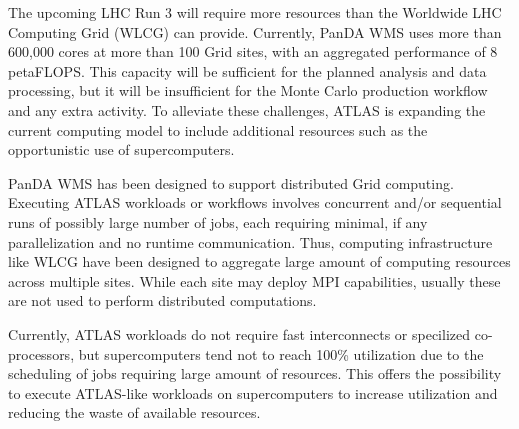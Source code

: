 
The upcoming LHC Run 3 will require more resources than the Worldwide LHC
Computing Grid (WLCG) can provide. Currently, PanDA WMS uses more than
600,000 cores at more than 100 Grid sites, with an aggregated performance of
8 petaFLOPS\@. This capacity will be sufficient for the planned analysis
and data processing, but it will be insufficient for the Monte Carlo
production workflow and any extra activity. To alleviate these challenges,
ATLAS is expanding the current computing model to include additional
resources such as the opportunistic use of supercomputers.

PanDA WMS has been designed to support distributed Grid computing. Executing
ATLAS workloads or workflows involves concurrent and/or sequential runs of
possibly large number of jobs, each requiring minimal, if any parallelization
and no runtime communication. Thus, computing infrastructure like WLCG have
been designed to aggregate large amount of computing resources across
multiple sites. While each site may deploy MPI capabilities, usually these
are not used to perform distributed computations.

Currently, ATLAS workloads do not require fast interconnects or specilized
co-processors, but supercomputers tend not to reach 100\% utilization due to
the scheduling of jobs requiring large amount of resources. This offers the
possibility to execute ATLAS-like workloads on supercomputers to increase
utilization and reducing the waste of available resources.


